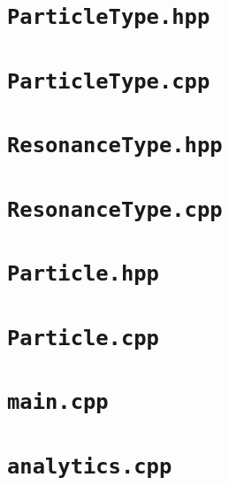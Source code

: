 \section{\texttt{ParticleType.hpp}}
   

\section{\texttt{ParticleType.cpp}}


\section{\texttt{ResonanceType.hpp}}


\section{\texttt{ResonanceType.cpp}}


\section{\texttt{Particle.hpp}}


\section{\texttt{Particle.cpp}}


\section{\texttt{main.cpp}}


\section{\texttt{analytics.cpp}}
